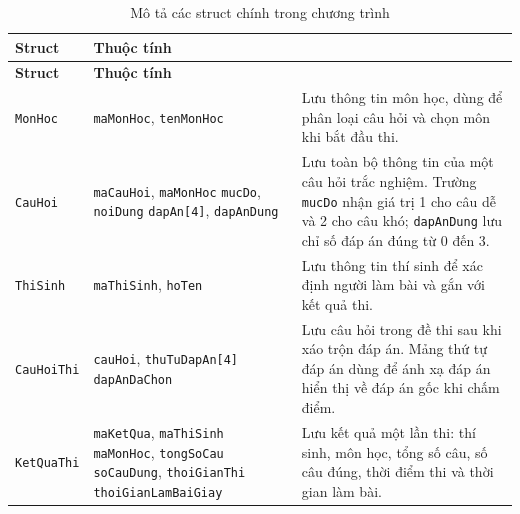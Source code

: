 \documentclass[12pt,a4paper]{report}
\newcommand{\codecell}[1]{\texttt{#1}}
\begin{document}
\begin{longtable}{|>{\centering\arraybackslash}m{}|>{\centering\arraybackslash}m{}|>{\raggedright\arraybackslash}m{}|}
\caption{Mô tả các struct chính trong chương trình}\label{tab:struct-chinh}\\
\hline
\textbf{Struct} & \textbf{Thuộc tính} & \multicolumn{1}{>{\centering\arraybackslash}m{0.43\textwidth}|}{\textbf{Vai trò}} \\
\hline
\endfirsthead
\hline
\textbf{Struct} & \textbf{Thuộc tính} & \multicolumn{1}{>{\centering\arraybackslash}m{0.43\textwidth}|}{\textbf{Vai trò}} \\
\hline
\endhead

\codecell{MonHoc} & 
\codecell{maMonHoc}, \codecell{tenMonHoc} & 
Lưu thông tin môn học, dùng để phân loại câu hỏi và chọn môn khi bắt đầu thi. \\
\hline

\codecell{CauHoi} & 
\codecell{maCauHoi}, \codecell{maMonHoc}\newline
\codecell{mucDo}, \codecell{noiDung}\newline
\codecell{dapAn[4]}, \codecell{dapAnDung} & 
Lưu toàn bộ thông tin của một câu hỏi trắc nghiệm. Trường \codecell{mucDo} nhận giá trị 1 cho câu dễ và 2 cho câu khó; \codecell{dapAnDung} lưu chỉ số đáp án đúng từ 0 đến 3. \\
\hline

\codecell{ThiSinh} & 
\codecell{maThiSinh}, \codecell{hoTen} & 
Lưu thông tin thí sinh để xác định người làm bài và gắn với kết quả thi. \\
\hline

\codecell{CauHoiThi} & 
\codecell{cauHoi}, \codecell{thuTuDapAn[4]}\newline
\codecell{dapAnDaChon} & 
Lưu câu hỏi trong đề thi sau khi xáo trộn đáp án. Mảng thứ tự đáp án dùng để ánh xạ đáp án hiển thị về đáp án gốc khi chấm điểm. \\
\hline

\codecell{KetQuaThi} & 
\codecell{maKetQua}, \codecell{maThiSinh}\newline
\codecell{maMonHoc}, \codecell{tongSoCau}\newline
\codecell{soCauDung}, \codecell{thoiGianThi}\newline
\codecell{thoiGianLamBaiGiay} & 
Lưu kết quả một lần thi: thí sinh, môn học, tổng số câu, số câu đúng, thời điểm thi và thời gian làm bài. \\
\hline
\end{longtable}
\end{document}
